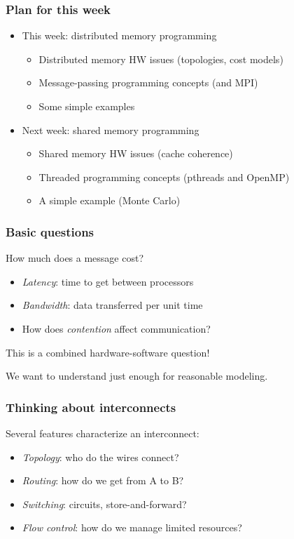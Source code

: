 \documentclass{beamer}
\begin{document}
\begin{frame}
  \titlepage
\end{frame}


\begin{frame}
  \frametitle{Plan for this week}

  \begin{itemize}
  \item This week: distributed memory programming
    \begin{itemize}
    \item Distributed memory HW issues (topologies, cost models)
    \item Message-passing programming concepts (and MPI)
    \item Some simple examples
    \end{itemize}

  \vspace{5mm}
  \item Next week: shared memory programming
    \begin{itemize}
    \item Shared memory HW issues (cache coherence)
    \item Threaded programming concepts (pthreads and OpenMP)
    \item A simple example (Monte Carlo)
    \end{itemize}
  \end{itemize}
    
\end{frame}


\begin{frame}
  \frametitle{Basic questions}

  How much does a message cost?
  \begin{itemize}
  \item {\em Latency}: time to get between processors
  \item {\em Bandwidth}: data transferred per unit time
  \item How does {\em contention} affect communication?
  \end{itemize}
  This is a combined hardware-software question!

  \vspace{5mm}
  We want to understand just enough for reasonable modeling.

\end{frame}


\begin{frame}
  \frametitle{Thinking about interconnects}

  Several features characterize an interconnect:
  \begin{itemize}
  \item {\em Topology}: who do the wires connect?
  \item {\em Routing}: how do we get from A to B?
  \item {\em Switching}: circuits, store-and-forward?
  \item {\em Flow control}: how do we manage limited resources?
  \end{itemize}
\end{frame}
\end{document}
